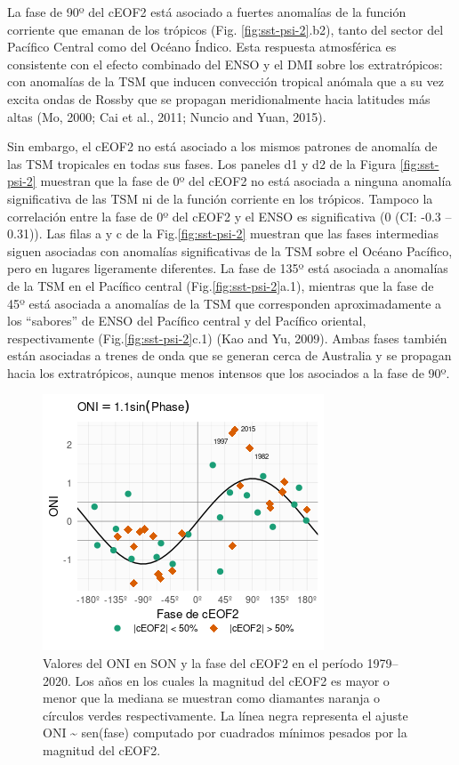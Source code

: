 \documentclass[12pt,oneside]{reedthesis}
\begin{document}
La fase de 90º del cEOF2 está asociado a fuertes anomalías de la función corriente que emanan de los trópicos (Fig. \ref{fig:sst-psi-2}.b2), tanto del sector del Pacífico Central como del Océano Índico.
Esta respuesta atmosférica es consistente con el efecto combinado del ENSO y el DMI sobre los extratrópicos: con anomalías de la TSM que inducen convección tropical anómala que a su vez excita ondas de Rossby que se propagan meridionalmente hacia latitudes más altas (Mo, 2000; Cai et al., 2011; Nuncio and Yuan, 2015).

Sin embargo, el cEOF2 no está asociado a los mismos patrones de anomalía de las TSM tropicales en todas sus fases.
Los paneles d1 y d2 de la Figura \ref{fig:sst-psi-2} muestran que la fase de 0º del cEOF2 no está asociada a ninguna anomalía significativa de las TSM ni de la función corriente en los trópicos.
Tampoco la correlación entre la fase de 0º del cEOF2 y el ENSO es significativa (0 (CI: -0.3 -- 0.31)).
Las filas a y c de la Fig.\ref{fig:sst-psi-2} muestran que las fases intermedias siguen asociadas con anomalías significativas de la TSM sobre el Océano Pacífico, pero en lugares ligeramente diferentes.
La fase de 135º está asociada a anomalías de la TSM en el Pacífico central (Fig.\ref{fig:sst-psi-2}a.1), mientras que la fase de 45º está asociada a anomalías de la TSM que corresponden aproximadamente a los ``sabores'' de ENSO del Pacífico central y del Pacífico oriental, respectivamente (Fig.\ref{fig:sst-psi-2}c.1) (Kao and Yu, 2009).
Ambas fases también están asociadas a trenes de onda que se generan cerca de Australia y se propagan hacia los extratrópicos, aunque menos intensos que los asociados a la fase de 90º.



\begin{figure}
\includegraphics{figures/20-ceofs/enso-phase-1} \caption{Valores del ONI en SON y la fase del cEOF2 en el período 1979--2020. Los años en los cuales la magnitud del cEOF2 es mayor o menor que la mediana se muestran como diamantes naranja o círculos verdes respectivamente. La línea negra representa el ajuste ONI \textasciitilde{} sen(fase) computado por cuadrados mínimos pesados por la magnitud del cEOF2.}\label{fig:enso-phase}
\end{figure}
\end{document}
